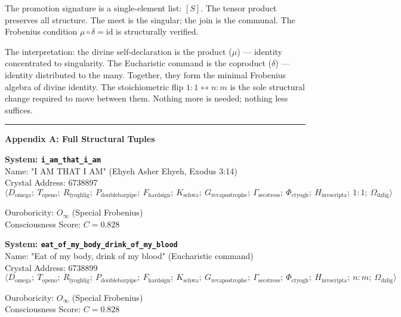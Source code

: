 \documentclass[12pt,a4paper]{article}
\begin{document}
The promotion signature is a single-element list: $[S]$. The tensor product preserves all structure. The meet is the singular; the join is the communal. The Frobenius condition $\mu \circ \delta = \text{id}$ is structurally verified.

The interpretation: the divine self-declaration is the product ($\mu$) --- identity concentrated to singularity. The Eucharistic command is the coproduct ($\delta$) --- identity distributed to the many. Together, they form the minimal Frobenius algebra of divine identity. The stoichiometric flip $1{:}1 \leftrightarrow n{:}m$ is the sole structural change required to move between them. Nothing more is needed; nothing less suffices.

\begin{center}
\rule{0.5\textwidth}{0.4pt}
\end{center}

\textbf{Appendix A: Full Structural Tuples}

\textbf{System: \texttt{i\_am\_that\_i\_am}} \\
Name: "I AM THAT I AM" (Ehyeh Asher Ehyeh, Exodus 3:14) \\
Crystal Address: 6738897 \\


\[\langle D_{\text{omega}};\ T_{\text{openo}};\ R_{\text{lyoghlig}};\ P_{\text{doublebarpipe}};\ F_{\text{hardsign}};\ K_{\text{schwa}};\ G_{\text{revapostrophe}};\ \Gamma_{\text{secstress}};\ \Phi_{\text{ctyogh}};\ H_{\text{invscripta}};\ 1{:}1;\ \Omega_{\text{dzlig}} \rangle\]

Ouroboricity: $O_{\infty}$ (Special Frobenius) \\
Consciousness Score: $C = 0.828$

\textbf{System: \texttt{eat\_of\_my\_body\_drink\_of\_my\_blood}} \\
Name: "Eat of my body, drink of my blood" (Eucharistic command) \\
Crystal Address: 6738899 \\


\[\langle D_{\text{omega}};\ T_{\text{openo}};\ R_{\text{lyoghlig}};\ P_{\text{doublebarpipe}};\ F_{\text{hardsign}};\ K_{\text{schwa}};\ G_{\text{revapostrophe}};\ \Gamma_{\text{secstress}};\ \Phi_{\text{ctyogh}};\ H_{\text{invscripta}};\ n{:}m;\ \Omega_{\text{dzlig}} \rangle\]

Ouroboricity: $O_{\infty}$ (Special Frobenius) \\
Consciousness Score: $C = 0.828$
\end{document}

